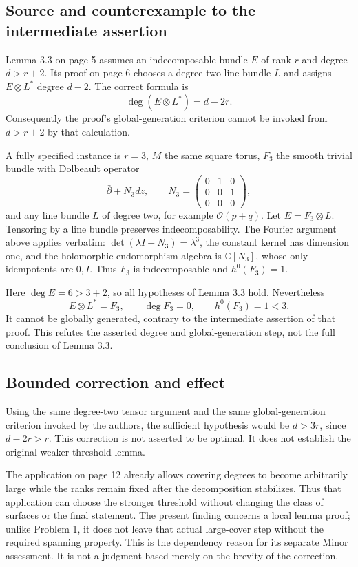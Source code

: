 \documentclass[10pt]{article}
\begin{document}
\subsection*{Source and counterexample to the intermediate assertion}
Lemma 3.3 on page 5 assumes an indecomposable bundle \(E\) of rank \(r\) and degree \(d>r+2\). Its proof on page 6 chooses a degree-two line bundle \(L\) and assigns \(E\otimes L^*\) degree \(d-2\). The correct formula is \[\deg(E\otimes L^*)=d-2r.\] Consequently the proof’s global-generation criterion cannot be invoked from \(d>r+2\) by that calculation.\par
A fully specified instance is \(r=3\), \(M\) the same square torus, \(F_3\) the smooth trivial bundle with Dolbeault operator \[\bar\partial+N_3d\bar z,\qquad
N_3=\begin{pmatrix}0&1&0\\0&0&1\\0&0&0\end{pmatrix},\] and any line bundle \(L\) of degree two, for example \(\mathcal O(p+q)\). Let \(E=F_3\otimes L\). Tensoring by a line bundle preserves indecomposability. The Fourier argument above applies verbatim: \(\det(\lambda I+N_3)=\lambda^3\), the constant kernel has dimension one, and the holomorphic endomorphism algebra is \(\mathbb C[N_3]\), whose only idempotents are \(0,I\). Thus \(F_3\) is indecomposable and \(h^0(F_3)=1\).\par
Here \(\deg E=6>3+2\), so all hypotheses of Lemma 3.3 hold. Nevertheless \[E\otimes L^*=F_3,\qquad \deg F_3=0,\qquad h^0(F_3)=1<3.\] It cannot be globally generated, contrary to the intermediate assertion of that proof. This refutes the asserted degree and global-generation step, not the full conclusion of Lemma 3.3.\par
\subsection*{Bounded correction and effect}
Using the same degree-two tensor argument and the same global-generation criterion invoked by the authors, the sufficient hypothesis would be \(d>3r\), since \(d-2r>r\). This correction is not asserted to be optimal. It does not establish the original weaker-threshold lemma.\par
The application on page 12 already allows covering degrees to become arbitrarily large while the ranks remain fixed after the decomposition stabilizes. Thus that application can choose the stronger threshold without changing the class of surfaces or the final statement. The present finding concerns a local lemma proof; unlike Problem 1, it does not leave that actual large-cover step without the required spanning property. This is the dependency reason for its separate Minor assessment. It is not a judgment based merely on the brevity of the correction.\par
\end{document}
